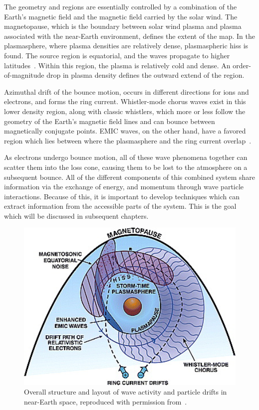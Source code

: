 The geometry and regions are essentially controlled by a combination of the Earth's magnetic field and the magnetic field carried by the solar wind. The magnetopause, which is the boundary between solar wind plasma and plasma associated with the near-Earth environment, defines the extent of the map. In the plasmasphere, where plasma densities are relatively dense, plasmaspheric hiss is found. The source region is equatorial, and the waves propagate to higher latitudes~\citep{thorne2010}. Within this region, the plasma is relatively cold and dense. An order-of-magnitude drop in plasma density defines the outward extend of the region. 

Azimuthal drift of the bounce motion, occurs in different directions for ions and electrons, and forms the ring current. Whistler-mode chorus waves exist in this lower density region, along with classic whistlers, which more or less follow the geometry of the Earth's magnetic field lines and can bounce between magnetically conjugate points. EMIC waves, on the other hand, have a favored region which lies between where the plasmasphere and the ring current overlap~\citep{thorne2010}.

As electrons undergo bounce motion, all of these wave phenomena together can scatter them into the loss cone, causing them to be lost to the atmosphere on a subsequent bounce. All of the different components of this combined system share information via the exchange of energy, and momentum through wave particle interactions. Because of this, it is important to develop techniques which can extract information from the accessible parts of the system. This is the goal which will be discussed in subsequent chapters.  

\clearpage
\begin{figure}[h!]
\label{anatomy}
\centering
\includegraphics[width=1.0\textwidth,angle=0]{figures/chapter_2/anatomy/anatomy.png}
\caption{Overall structure and layout of wave activity and particle drifts in near-Earth space, reproduced with permission from~\citet{thorne2010}.}
\end{figure}
\newpage
